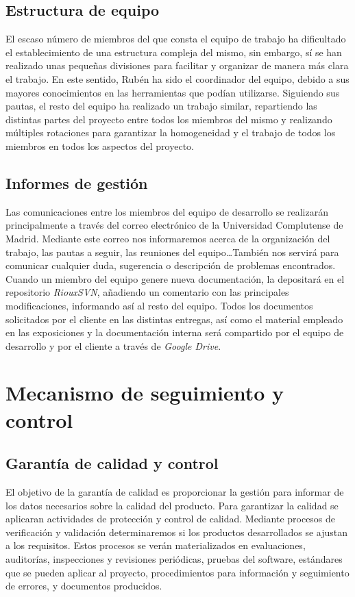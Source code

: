 \documentclass[11pt, a4paper, twoside, titlepage]{article}
\begin{document}
		\subsection{Estructura de equipo}	%
		El escaso número de miembros del que consta el equipo de trabajo ha dificultado el establecimiento de una estructura compleja del mismo, sin embargo, sí se han realizado unas pequeñas divisiones para facilitar y organizar de manera más clara el trabajo. En este sentido, Rubén ha sido el coordinador del equipo, debido a sus mayores conocimientos en las herramientas que podían utilizarse. Siguiendo sus pautas, el resto del equipo ha realizado un trabajo similar, repartiendo las distintas partes del proyecto entre todos los miembros del mismo y realizando múltiples rotaciones para garantizar la homogeneidad y el trabajo de todos los miembros en todos los aspectos del proyecto.
		\subsection{Informes de gestión}
		Las comunicaciones entre los miembros del equipo de desarrollo se realizarán principalmente a través del correo electrónico de la Universidad Complutense de Madrid. Mediante este correo nos informaremos acerca de la organización del trabajo, las pautas a seguir, las reuniones del equipo\ldots También nos servirá para comunicar cualquier duda, sugerencia o descripción de problemas encontrados. \\
		Cuando un miembro del equipo genere nueva documentación, la depositará en el repositorio \textit{RiouxSVN}, añadiendo un comentario con las principales modificaciones, informando así al resto del equipo. Todos los documentos solicitados por el cliente en las distintas entregas, así como el material empleado en las exposiciones y la documentación interna será compartido por el equipo de desarrollo y por el cliente a través de  \textit{Google Drive}.
	\section{Mecanismo de seguimiento y control}
		\subsection{Garantía de calidad y control}
		El objetivo de la garantía de calidad es proporcionar la gestión para informar de los datos necesarios sobre la calidad del producto. Para garantizar la calidad se aplicaran actividades de protección y control de calidad. Mediante procesos de verificación y validación determinaremos si los productos desarrollados se ajustan a los requisitos. Estos procesos se verán materializados en evaluaciones, auditorías, inspecciones y revisiones periódicas, pruebas del software, estándares que se pueden aplicar al proyecto, procedimientos para información y seguimiento de errores, y documentos producidos.
\end{document}
